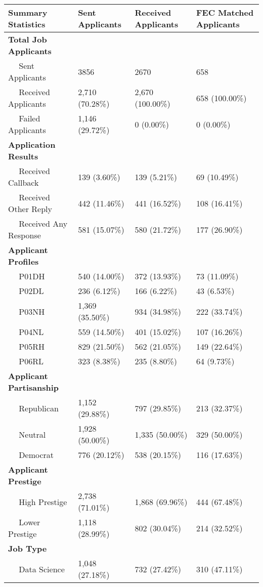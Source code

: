 
\begin{tabular}{llll}
\toprule
Summary Statistics & Sent Applicants & Received Applicants & FEC Matched Applicants\\
\midrule
\bf{Total Job Applicants} & ~ & ~ & ~\\
~~ Sent Applicants & 3856 & 2670 & 658\\
~~ Received Applicants & 2,710 (70.28\%) & 2,670 (100.00\%) & 658 (100.00\%)\\
~~ Failed Applicants & 1,146 (29.72\%) & 0 (0.00\%) & 0 (0.00\%)\\
\bf{Application Results} & ~ & ~ & ~\\
\addlinespace
~~ Received Callback & 139 (3.60\%) & 139 (5.21\%) & 69 (10.49\%)\\
~~ Received Other Reply & 442 (11.46\%) & 441 (16.52\%) & 108 (16.41\%)\\
~~ Received Any Response & 581 (15.07\%) & 580 (21.72\%) & 177 (26.90\%)\\
\bf{Applicant Profiles} & ~ & ~ & ~\\
~~ P01DH & 540 (14.00\%) & 372 (13.93\%) & 73 (11.09\%)\\
\addlinespace
~~ P02DL & 236 (6.12\%) & 166 (6.22\%) & 43 (6.53\%)\\
~~ P03NH & 1,369 (35.50\%) & 934 (34.98\%) & 222 (33.74\%)\\
~~ P04NL & 559 (14.50\%) & 401 (15.02\%) & 107 (16.26\%)\\
~~ P05RH & 829 (21.50\%) & 562 (21.05\%) & 149 (22.64\%)\\
~~ P06RL & 323 (8.38\%) & 235 (8.80\%) & 64 (9.73\%)\\
\addlinespace
\bf{Applicant Partisanship} & ~ & ~ & ~\\
~~ Republican & 1,152 (29.88\%) & 797 (29.85\%) & 213 (32.37\%)\\
~~ Neutral & 1,928 (50.00\%) & 1,335 (50.00\%) & 329 (50.00\%)\\
~~ Democrat & 776 (20.12\%) & 538 (20.15\%) & 116 (17.63\%)\\
\bf{Applicant Prestige} & ~ & ~ & ~\\
\addlinespace
~~ High Prestige & 2,738 (71.01\%) & 1,868 (69.96\%) & 444 (67.48\%)\\
~~ Lower Prestige & 1,118 (28.99\%) & 802 (30.04\%) & 214 (32.52\%)\\
\bf{Job Type} & ~ & ~ & ~\\
~~ Data Science & 1,048 (27.18\%) & 732 (27.42\%) & 310 (47.11\%)\\

\end{tabular}
